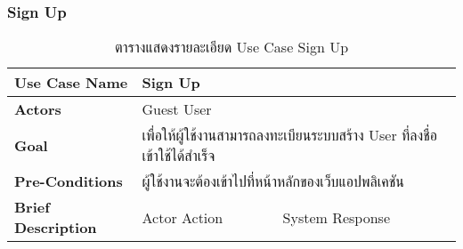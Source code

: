 \documentclass[12pt,oneside,openright,a4paper]{cpe-thai-project}
\begin{document}
\subsubsection{Sign Up}
\begin{table}[!h]
\caption{ตารางแสดงรายละเอียด Use Case Sign Up}\label{tbl:table3.6}
\begin{tabular}{|l|ll|}
\hline
\textbf{Use Case Name}     & \multicolumn{2}{l|}{Sign Up}                                                                                                                                                                                                                                                                                                                                                                                                                                  \\ \hline
\textbf{Actors}            & \multicolumn{2}{l|}{Guest User}                                                                                                                                                                                                                                                                                                                                                                                                                               \\ \hline
\textbf{Goal}              & \multicolumn{2}{l|}{เพื่อให้ผู้ใช้งานสามารถลงทะเบียนระบบสร้าง User ที่ลงชื่อเข้าใช้ได้สำเร็จ}                                                                                                                                                                                                                                                                                                                                                                 \\ \hline
\textbf{Pre-Conditions}    & \multicolumn{2}{l|}{ผู้ใช้งานจะต้องเข้าไปที่หน้าหลักของเว็บแอปพลิเคชัน}                                                                                                                                                                                                                                                                                                                                                                                       \\ \hline
\textbf{Brief Description} & \multicolumn{1}{l|}{Actor Action}                                                                                                                                                                & System Response                                                                                                                                                                                                                                            \\ \hline

\end{tabular}
\end{table}
\end{document}
